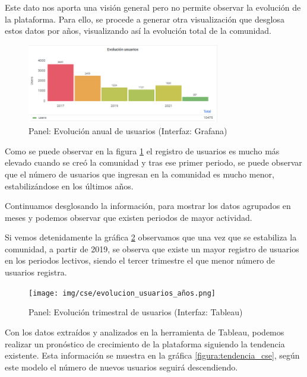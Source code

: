 \documentclass[a4paper, 12pt]{book}
\begin{document}
Este dato nos aporta una visión general pero no permite observar la evolución de la plataforma. Para ello, se procede a generar otra visualización que desglosa estos datos por años, visualizando así la evolución total de la comunidad.

\begin{figure}[ht]
    \centering
    \includegraphics[width=0.75\textwidth]{img/cse/evolucion_usuarios.png}
    \caption{Panel: Evolución anual de usuarios (Interfaz: Grafana)}
    \label{figura:evo_users}
\end{figure}

Como se puede observar en la figura \ref{figura:evo_users} el registro de usuarios es mucho más elevado cuando se creó la comunidad y tras ese primer periodo, se puede observar que el número de usuarios que ingresan en la comunidad es mucho menor, estabilizándose en los últimos años.

Continuamos desglosando la información, para mostrar los datos agrupados en meses y podemos observar que existen periodos de mayor actividad.

Si vemos detenidamente la gráfica \ref{figura:evo_users_trim} observamos que una vez que se estabiliza la comunidad, a partir de 2019, se observa que existe un mayor registro de usuarios en los periodos lectivos, siendo el tercer trimestre el que menor número de usuarios registra. 

\begin{figure}[ht]
    \centering
    \texttt{[image: img/cse/evolucion\_usuarios\_años.png]}
    \caption{Panel: Evolución trimestral de usuarios (Interfaz: Tableau)}
    \label{figura:evo_users_trim}
\end{figure}

Con los datos extraídos y analizados en la herramienta de Tableau, podemos realizar un pronóstico de crecimiento de la plataforma siguiendo la tendencia existente. Esta información se muestra en la gráfica \ref{figura:tendencia_cse}, según este modelo el número de nuevos usuarios seguirá descendiendo.
\end{document}
